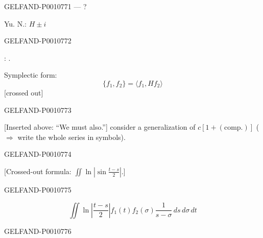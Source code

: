 \begin{GelfandAdjacentEvidence}{GELFAND-P001077}{1}
 — ?

Yu. N.\quad{}: $H\pm i$
\end{GelfandAdjacentEvidence}
\begin{GelfandAdjacentEvidence}{GELFAND-P001077}{2}


: .

Symplectic form:
\begin{equation*}
\{f_1,f_2\}=\langle f_1,Hf_2\rangle
\end{equation*}
 [crossed out]
\end{GelfandAdjacentEvidence}
\begin{GelfandAdjacentEvidence}{GELFAND-P001077}{3}

[Inserted above: “We must also.”] consider a generalization of $c[1+(\text{comp.})]$
($\Rightarrow$ write the whole series in symbols).
\end{GelfandAdjacentEvidence}
\begin{GelfandAdjacentEvidence}{GELFAND-P001077}{4}


[Crossed-out formula: \(\iint\ln\left|\sin\frac{t-s}{2}\right|\).]
\end{GelfandAdjacentEvidence}
\begin{GelfandAdjacentEvidence}{GELFAND-P001077}{5}


\begin{equation*}
\iint\ln\left|\frac{t-s}{2}\right|f_1(t)f_2(\sigma)
\frac{1}{s-\sigma}\,ds\,d\sigma\,dt
\end{equation*}
\end{GelfandAdjacentEvidence}
\begin{GelfandAdjacentEvidence}{GELFAND-P001077}{6}

\end{GelfandAdjacentEvidence}
